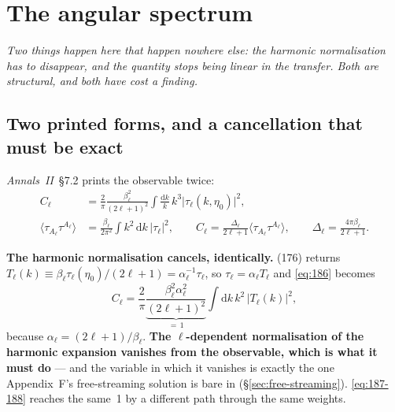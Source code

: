 %
%
\section{The angular spectrum}
\label{sec:spectrum}

\emph{Two things happen here that happen nowhere else: the harmonic
normalisation has to disappear, and the quantity stops being linear in the
transfer. Both are structural, and both have cost a finding.}

\subsection{Two printed forms, and a cancellation that must be exact}

\emph{Annals~II}~\S7.2 prints the observable twice:
\begin{align}
  C_\ell&=\frac2\pi\frac{\beta_\ell^2}{(2\ell+1)^2}
          \int\frac{\mathrm dk}{k}\,k^3\big|\tau_\ell(k,\eta_0)\big|^2,
          \tag{186}\label{eq:186}\\
  \big\langle\tau_{A_\ell}\tau^{A_\ell}\big\rangle
        &=\frac{\beta_\ell}{2\pi^2}\int k^2\,\mathrm dk\,\big|\tau_\ell\big|^2,
          \qquad
  C_\ell=\frac{\Delta_\ell}{2\ell+1}\big\langle\tau_{A_\ell}\tau^{A_\ell}\big\rangle,
  \qquad \Delta_\ell=\frac{4\pi\beta_\ell}{2\ell+1}.
          \tag{187, 188}\label{eq:187-188}
\end{align}

\textbf{The harmonic normalisation cancels, identically.} (176) returns
$T_\ell(k)\equiv\beta_\ell\tau_\ell(\eta_0)/(2\ell+1)=\alpha_\ell^{-1}\tau_\ell$,
so $\tau_\ell=\alpha_\ell T_\ell$ and \eqref{eq:186} becomes
\begin{equation}
  C_\ell=\frac2\pi\underbrace{\frac{\beta_\ell^2\alpha_\ell^2}{(2\ell+1)^2}}_{=\,1}
         \int \mathrm dk\,k^2\,\big|T_\ell(k)\big|^2 ,
  \label{eq:cl-reduced}
\end{equation}
because $\alpha_\ell=(2\ell+1)/\beta_\ell$. \textbf{The $\ell$-dependent
normalisation of the harmonic expansion vanishes from the observable, which is
what it must do} --- and the variable in which it vanishes is exactly the one
Appendix~F's free-streaming solution is bare in (\S\ref{sec:free-streaming}).
\eqref{eq:187-188} reaches the same~1 by a different path through the same
weights.

